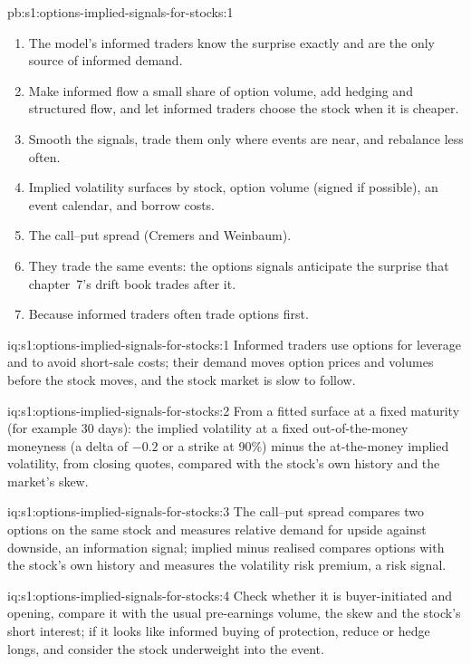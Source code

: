 \begin{solution}{pb:s1:options-implied-signals-for-stocks:1}
\begin{enumerate}
\item The model's informed traders know the surprise exactly and are the only source of informed demand.
\item Make informed flow a small share of option volume, add hedging and structured flow, and let informed traders choose the stock when it is cheaper.
\item Smooth the signals, trade them only where events are near, and rebalance less often.
\item Implied volatility surfaces by stock, option volume (signed if possible), an event calendar, and borrow costs.
\item The call--put spread (Cremers and Weinbaum).
\item They trade the same events: the options signals anticipate the surprise that chapter~7's drift book trades after it.
\item Because informed traders often trade options first.
\end{enumerate}
\end{solution}

\begin{solution}{iq:s1:options-implied-signals-for-stocks:1}
Informed traders use options for leverage and to avoid short-sale costs; their demand moves option prices and volumes before the stock moves, and the stock
market is slow to follow.
\end{solution}

\begin{solution}{iq:s1:options-implied-signals-for-stocks:2}
From a fitted surface at a fixed maturity (for example 30 days): the implied volatility at a fixed out-of-the-money moneyness (a delta of $-0.2$ or a strike at
90\%) minus the at-the-money implied volatility, from closing quotes, compared with the stock's own history and the market's skew.
\end{solution}

\begin{solution}{iq:s1:options-implied-signals-for-stocks:3}
The call--put spread compares two options on the same stock and measures relative demand for upside against downside, an information signal; implied minus
realised compares options with the stock's own history and measures the volatility risk premium, a risk signal.
\end{solution}

\begin{solution}{iq:s1:options-implied-signals-for-stocks:4}
Check whether it is buyer-initiated and opening, compare it with the usual pre-earnings volume, the skew and the stock's short interest; if it looks like
informed buying of protection, reduce or hedge longs, and consider the stock underweight into the event.
\end{solution}

